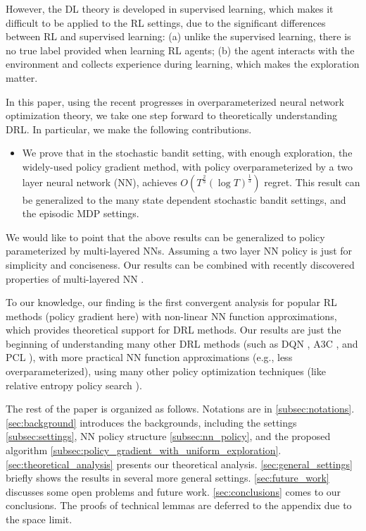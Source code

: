 However, the DL theory is developed in supervised learning, which makes it difficult to be applied to the RL settings, due to the significant differences between RL and supervised learning: (a) unlike the supervised learning, there is no true label provided when learning RL agents; (b) the agent interacts with the environment and collects experience during learning, which makes the exploration matter.

In this paper, using the recent progresses in overparameterized neural network optimization theory, we take one step forward to theoretically understanding DRL. In particular, we make the following contributions.
\begin{itemize}
    \item We prove that in the stochastic bandit setting, with enough exploration, the widely-used policy gradient method, with policy overparameterized by a two layer neural network (NN), achieves $O\left( T^{\frac{2}{3} } \left(\log{T}\right)^{\frac{1}{3}}\right)$ regret. This result can be generalized to the many state dependent stochastic bandit settings, and the episodic MDP settings.
\end{itemize}

We would like to point that the above results can be generalized to policy parameterized by multi-layered NNs. Assuming a two layer NN policy is just for simplicity and conciseness. Our results can be combined with recently discovered properties of multi-layered NN   \citep{allen2018convergenceA,allen2018convergenceB,du2018gradientA}.

To our knowledge, our finding is the first convergent analysis for popular RL methods (policy gradient here) with non-linear NN function approximations, which provides theoretical support for DRL methods. Our results are just the beginning of understanding many other DRL methods (such as DQN \cite{mnih2015human}, A3C \citep{mnih2016asynchronous}, and PCL \citep{nachum2017bridging}), with more practical NN function approximations (e.g., less overparameterized), using many other policy optimization techniques (like relative entropy policy search \citep{peters2010relative}).

The rest of the paper is organized as follows. Notations are in \cref{subsec:notations}. \cref{sec:background} introduces the backgrounds, including the settings \cref{subsec:settings}, NN policy structure \cref{subsec:nn_policy}, and the proposed algorithm \cref{subsec:policy_gradient_with_uniform_exploration}. \cref{sec:theoretical_analysis} presents our theoretical analysis. \cref{sec:general_settings} briefly shows the results in several more general settings. \cref{sec:future_work} discusses some open problems and future work. \cref{sec:conclusions} comes to our conclusions. The proofs of technical lemmas are deferred to the appendix due to the space limit.

